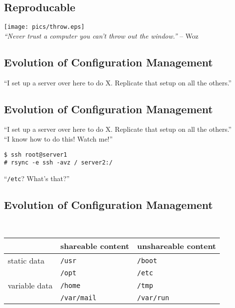 \documentclass[xga]{xdvislides}
\begin{document}
\subsection{Reproducable}
\vspace*{\fill}
\begin{center}
	\texttt{[image: pics/throw.eps]} \\
	\vspace*{\fill}
	{\em ``Never trust a computer you can't throw out the
window.''} -- Woz
\end{center}

\subsection{Evolution of Configuration Management}
``I set up a server over here to do X.  Replicate that
setup on all the others.'' \\

\subsection{Evolution of Configuration Management}
``I set up a server over here to do X.  Replicate that
setup on all the others.'' \\

``I know how to do this!  Watch me!'' \\
\begin{verbatim}
$ ssh root@server1
# rsync -e ssh -avz / server2:/
\end{verbatim}
\vspace{.5in}
``{\tt /etc}?  What's that?''

\subsection{Evolution of Configuration Management}
\\

\vspace{.5in}
\Huge
        \begin{tabular}{ l | l | l }
        & shareable content & unshareable content \\
        \hline
        static data & {\tt /usr} & {\tt /boot} \\
        & {\tt /opt} & {\tt /etc} \\
        \hline
        variable data & {\tt /home} & {\tt /tmp} \\
        & {\tt /var/mail} & {\tt /var/run} \\
        \hline
        \end{tabular}
\Normalsize
\end{document}
